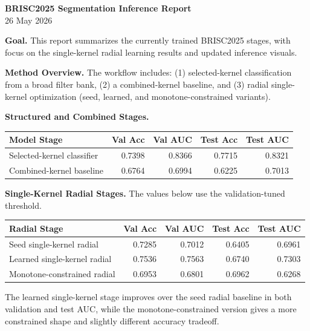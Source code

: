 \documentclass[10pt]{article}
\begin{document}
\small

\begin{center}
{\Large \textbf{BRISC2025 Segmentation Inference Report}}\\
26 May 2026
\end{center}

\textbf{Goal.} This report summarizes the currently trained BRISC2025 stages, with focus on the single-kernel radial learning results and updated inference visuals.

\textbf{Method Overview.} The workflow includes: (1) selected-kernel classification from a broad filter bank, (2) a combined-kernel baseline, and (3) radial single-kernel optimization (seed, learned, and monotone-constrained variants).

\textbf{Structured and Combined Stages.}

\begin{center}
\begin{tabular}{lrrrr}
\toprule
\textbf{Model Stage} & \textbf{Val Acc} & \textbf{Val AUC} & \textbf{Test Acc} & \textbf{Test AUC} \\
\midrule
Selected-kernel classifier & 0.7398 & 0.8366 & 0.7715 & 0.8321 \\
Combined-kernel baseline & 0.6764 & 0.6994 & 0.6225 & 0.7013 \\
\bottomrule
\end{tabular}
\end{center}

\textbf{Single-Kernel Radial Stages.} The values below use the validation-tuned threshold.

\begin{center}
\begin{tabular}{lrrrr}
\toprule
\textbf{Radial Stage} & \textbf{Val Acc} & \textbf{Val AUC} & \textbf{Test Acc} & \textbf{Test AUC} \\
\midrule
Seed single-kernel radial & 0.7285 & 0.7012 & 0.6405 & 0.6961 \\
Learned single-kernel radial & 0.7536 & 0.7563 & 0.6740 & 0.7303 \\
Monotone-constrained radial & 0.6953 & 0.6801 & 0.6962 & 0.6268 \\
\bottomrule
\end{tabular}
\end{center}

The learned single-kernel stage improves over the seed radial baseline in both validation and test AUC, while the monotone-constrained version gives a more constrained shape and slightly different accuracy tradeoff.
\end{document}
